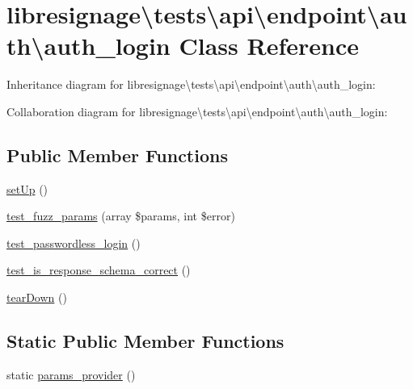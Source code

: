 \hypertarget{classlibresignage_1_1tests_1_1api_1_1endpoint_1_1auth_1_1auth__login}{}\section{libresignage\textbackslash{}tests\textbackslash{}api\textbackslash{}endpoint\textbackslash{}auth\textbackslash{}auth\+\_\+login Class Reference}
\label{classlibresignage_1_1tests_1_1api_1_1endpoint_1_1auth_1_1auth__login}


Inheritance diagram for libresignage\textbackslash{}tests\textbackslash{}api\textbackslash{}endpoint\textbackslash{}auth\textbackslash{}auth\+\_\+login\+:


Collaboration diagram for libresignage\textbackslash{}tests\textbackslash{}api\textbackslash{}endpoint\textbackslash{}auth\textbackslash{}auth\+\_\+login\+:
\subsection*{Public Member Functions}
\begin{DoxyCompactItemize}
\item 
\hyperlink{classlibresignage_1_1tests_1_1api_1_1endpoint_1_1auth_1_1auth__login_a973d754b109b7c0c04f26204f150b7b5}{set\+Up} ()
\item 
\hyperlink{classlibresignage_1_1tests_1_1api_1_1endpoint_1_1auth_1_1auth__login_a4a2e347ad2cf35153fb2426d309ef5e4}{test\+\_\+fuzz\+\_\+params} (array \$params, int \$error)
\item 
\hyperlink{classlibresignage_1_1tests_1_1api_1_1endpoint_1_1auth_1_1auth__login_a548cadbde57935fe517cbe4c393f91ee}{test\+\_\+passwordless\+\_\+login} ()
\item 
\hyperlink{classlibresignage_1_1tests_1_1api_1_1endpoint_1_1auth_1_1auth__login_ad9189f92cd70edaa9d1d6c74ed26c4ec}{test\+\_\+is\+\_\+response\+\_\+schema\+\_\+correct} ()
\item 
\hyperlink{classlibresignage_1_1tests_1_1api_1_1endpoint_1_1auth_1_1auth__login_a1f67d0584ea95314ebb51f5f73a195f9}{tear\+Down} ()
\end{DoxyCompactItemize}
\subsection*{Static Public Member Functions}
\begin{DoxyCompactItemize}
\item 
static \hyperlink{classlibresignage_1_1tests_1_1api_1_1endpoint_1_1auth_1_1auth__login_a9f357ecb6b6df658d6d3fa339bc4d73b}{params\+\_\+provider} ()
\end{DoxyCompactItemize}
